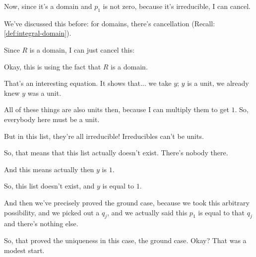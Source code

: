 \begin{proofWrapper}
\begin{speech}[00:39:17 - 00:41:44]
Now, since it's a domain and $p_1$ is not zero, because it's irreducible, I can cancel.

We've discussed this before: for domains, there's cancellation (Recall: \cref{def:integral-domain}).

Since $R$ is a domain, I can just cancel this: 

Okay, this is using the fact that $R$ is a domain. 

That's an interesting equation. It shows that... we take $y$; $y$ is a unit, we already knew $y$ was a unit.

All of these things are also units then, because I can multiply them to get $1$. So, everybody here must be a unit. 

But in this list, they're all irreducible! Irreducibles can't be units.

So, that means that this list actually doesn't exist. There's nobody there.

And this means actually then $y$ is $1$.

So, this list doesn't exist,  and $y$ is equal to $1$. 

And then we've precisely proved the ground case, because we took this arbitrary possibility, and we picked out a $q_j$, and we actually said this $p_1$ is equal to that $q_j$ and there's nothing else. 

So, that proved the uniqueness in this case, the ground case. Okay? That was a modest start.
\end{speech}


\end{proofWrapper}
